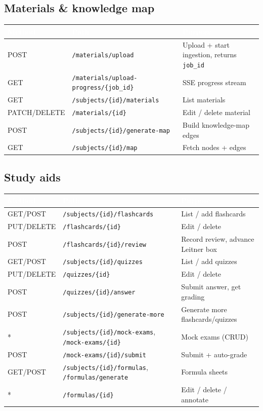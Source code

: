 \documentclass[11pt,a4paper]{article}
\newcommand{\code}[1]{\colorbox{fbCream}{\texttt{\small #1}}}
\newcommand{\hdr}[1]{\textcolor{white}{\bfseries #1}}
\begin{document}
\subsection{Materials \& knowledge map}
\begin{tabularx}{\textwidth}{l l L}
\toprule
{}\hdr{Method} & \hdr{Path} & \hdr{Purpose} \\
\midrule
POST  & \code{/materials/upload} & Upload + start ingestion, returns \code{job\_id} \\
GET   & \code{/materials/upload-progress/\{job\_id\}} & SSE progress stream \\
GET   & \code{/subjects/\{id\}/materials} & List materials \\
PATCH/DELETE & \code{/materials/\{id\}} & Edit / delete material \\
POST  & \code{/subjects/\{id\}/generate-map} & Build knowledge-map edges \\
GET   & \code{/subjects/\{id\}/map} & Fetch nodes + edges \\
\bottomrule
\end{tabularx}

\subsection{Study aids}
\begin{tabularx}{\textwidth}{l l L}
\toprule
{}\hdr{Method} & \hdr{Path} & \hdr{Purpose} \\
\midrule
GET/POST    & \code{/subjects/\{id\}/flashcards} & List / add flashcards \\
PUT/DELETE  & \code{/flashcards/\{id\}} & Edit / delete \\
POST        & \code{/flashcards/\{id\}/review} & Record review, advance Leitner box \\
GET/POST    & \code{/subjects/\{id\}/quizzes} & List / add quizzes \\
PUT/DELETE  & \code{/quizzes/\{id\}} & Edit / delete \\
POST        & \code{/quizzes/\{id\}/answer} & Submit answer, get grading \\
POST        & \code{/subjects/\{id\}/generate-more} & Generate more flashcards/quizzes \\
*           & \code{/subjects/\{id\}/mock-exams}, \code{/mock-exams/\{id\}} & Mock exams (CRUD) \\
POST        & \code{/mock-exams/\{id\}/submit} & Submit + auto-grade \\
GET/POST    & \code{/subjects/\{id\}/formulas}, \code{/formulas/generate} & Formula sheets \\
*           & \code{/formulas/\{id\}} & Edit / delete / annotate \\
\bottomrule
\end{tabularx}
\end{document}

